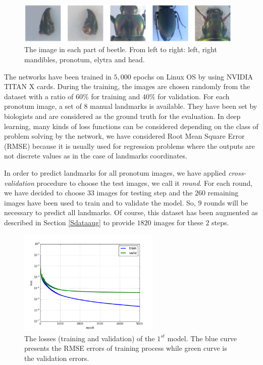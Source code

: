 \documentclass[review]{elsarticle}
\begin{document}
\begin{figure}[h]
	\centering
	\includegraphics[width=0.97\textwidth]{images/images5parts}
	\caption{The image in each part of beetle. From left to right:
          left, right mandibles, pronotum, elytra and head.}
	\label{fig5parts}
\end{figure}
The networks have been trained in $5, 000$ epochs on Linux OS by using
NVIDIA TITAN X cards. During the training, the images are chosen
randomly from the dataset with a ratio of $60\%$ for training and
$40\%$ for validation. For each pronotum image, a set of $8$ manual
landmarks is available. They have been set by biologists and are
considered as the ground truth for the evaluation. In deep learning,
many kinds of loss functions can be considered depending on the
class of problem solving by the network, we have considered Root Mean
Square Error (RMSE) because it is usually used for regression problems
where the outputs are not discrete values as in the case of landmarks coordinates.

In order to predict landmarks for all pronotum images, we have applied
\textit{cross-validation} procedure to choose the test images, we call
it \textit{round}. For each round, we have decided to choose $33$
images for testing step and the $260$ remaining images have been used to train and to validate the model. So, $9$ rounds will be necessary to predict
all landmarks. Of course, this dataset has been
augmented as described in Section \ref{Sdataaug} to provide $1820$ images for these $2$
steps.

\begin{figure}[h!]
    \centering
    \includegraphics[width=0.6\textwidth]{images/model1_loss}
    \caption{The losses (training and validation) of the $1^{st}$ model. The
      blue curve presents the RMSE errors of training process while
      green curve is the validation errors.}
    \label{figlosses}
\end{figure}
\end{document}
